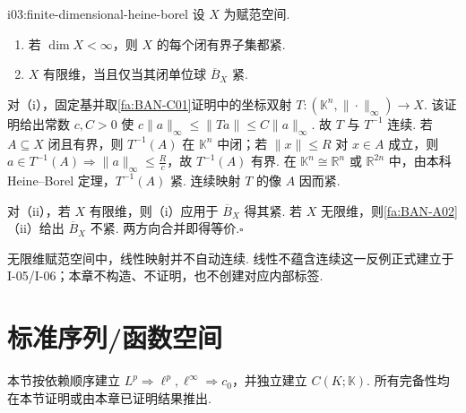 \begin{FAProposition}{i03:finite-dimensional-heine-borel}
设 \(\displaystyle X\) 为赋范空间.
\begin{enumerate}[label=\textup{(\roman*)}]
\item 若 \(\displaystyle \dim X<\infty\)，则 \(\displaystyle X\) 的每个闭有界子集都紧.
\item \(\displaystyle X\) 有限维，当且仅当其闭单位球 \(\displaystyle \overline B_X\) 紧.
\end{enumerate}
\end{FAProposition}

\begin{FAProof}
对（i），固定基并取\autoref{fa:BAN-C01}证明中的坐标双射 \(\displaystyle T:(\mathbb K^n,\|\cdot\|_\infty)\to X\). 该证明给出常数 \(\displaystyle c,C>0\) 使
\(\displaystyle c\|a\|_\infty\leqslant\|Ta\|\leqslant C\|a\|_\infty\).
故 \(\displaystyle T\) 与 \(\displaystyle T^{-1}\) 连续. 若 \(\displaystyle A\subseteq X\) 闭且有界，则 \(\displaystyle T^{-1}(A)\) 在 \(\displaystyle \mathbb K^n\) 中闭；若 \(\displaystyle \|x\|\leqslant R\) 对 \(\displaystyle x\in A\) 成立，则 \(\displaystyle a\in T^{-1}(A)\Rightarrow\|a\|_\infty\leqslant \frac{R}{c}\)，故 \(\displaystyle T^{-1}(A)\) 有界. 在 \(\displaystyle \mathbb K^n\cong\mathbb R^n\) 或 \(\displaystyle \mathbb R^{2n}\) 中，由本科 Heine--Borel 定理，\(\displaystyle T^{-1}(A)\) 紧. 连续映射 \(\displaystyle T\) 的像 \(\displaystyle A\) 因而紧.

对（ii），若 \(\displaystyle X\) 有限维，则（i）应用于 \(\displaystyle \overline B_X\) 得其紧. 若 \(\displaystyle X\) 无限维，则\autoref{fa:BAN-A02}（ii）给出 \(\displaystyle \overline B_X\) 不紧. 两方向合并即得等价.\hfill\(\square\)
\end{FAProof}

\begin{FAWarning}
无限维赋范空间中，线性映射并不自动连续. 线性不蕴含连续这一反例正式建立于 I-05/I-06；本章不构造、不证明，也不创建对应内部标签.
\end{FAWarning}

\section{标准序列/函数空间}\label{sec:i03-standard-spaces}

本节按依赖顺序建立 \(\displaystyle L^p\Rightarrow\ell^p,\ell^\infty\Rightarrow c_0\)，并独立建立 \(\displaystyle C(K;\mathbb K)\). 所有完备性均在本节证明或由本章已证明结果推出.

